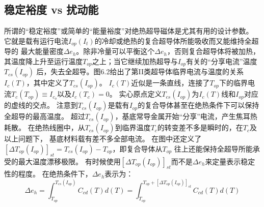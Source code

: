 \subsection{稳定裕度 vs 扰动能}
所谓的“稳定裕度”或简单的“能量裕度”对绝热超导磁体是尤其有用的设计参数。
它就是载有运行电流$I_{op}(I_t)$的冷却或绝热的复合超导体所能吸收而又能维持全超导的
最大能量密度$\Delta e_h$。除非冷量可以平衡这个$\Delta e_h$，否则复合超导体将被加热，
其温度降上升至运行温度$T_{op}$之上；当它继续加热超导与$I_{op}$有关的“分享电流”温度$T_{cs}(I_{op})$
后，失去全超导。图6.2给出了第II类超导体临界电流与温度的关系$I_c(T)$，其中定义了$T_{cs}(I_{op})$。
$I_c(T)$近似是一条直线，连接了$T_{op}$下的临界电流$T_c(T_{op})\equiv I_{c_o}$以及$I_c(T_c)=0$。
实心原点定义$T_{cs}(I_{op})$为$I_c(T)$线和$I_{op}$对应的虚线的交点。
注意到$T_{cs}(I_{op})$是载有$I_{op}$的复合导体甚至在绝热条件下可以保持全超导的最高温度。
超过$T_{cs}(I_{op})$，基底常导金属开始“分享”电流，产生焦耳热耗散。
在绝热线圈中，从$T_{cs}(I_{op})$到临界温度$T_c$的转变差不多是瞬时的，在$T_c$及以上问题下，
基底材料载有差不多全部电流。
在图中还定义了$[\Delta T_{op}(I_{op})]_{st}=T_{cs}(I_{op})-T_{op}$，即复合导体从$T_{op}$
往上还能保持全超导所能承受的最大温度漂移极限。
有时候使用$[\Delta T_{op}(I_{op})]_{st}$而不是$\Delta e_h$来定量表示稳定性的程度。
在绝热条件下，$\Delta e_h$表示为： 
\begin{equation}%
\Delta e_h=\int_{T_{op}}^{T_{cs}(I_{op})}{C_{cd}(T)d(T)}=\int_{T_{op}}^{T_{op}+[\Delta T_{op}(I_{op})]_{st}}{C_{cd}(T)d(T)}
\end{equation}

